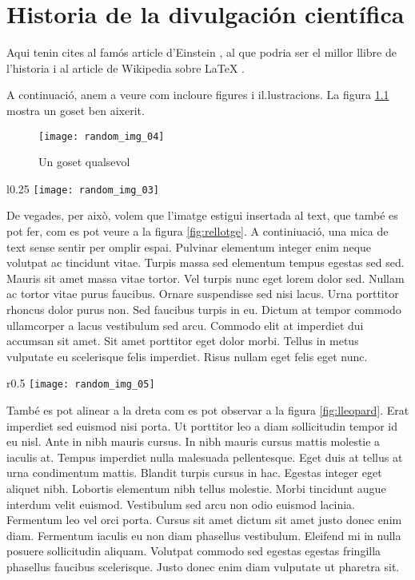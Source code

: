 \chapter{Historia de la divulgación científica}
\label{cap:primer}
Aqui tenin cites al famós article d'Einstein \autocite{Einstein05}, al que podria ser el millor llibre de l'historia \Autocite{GMMarquez67} i al article de Wikipedia sobre \LaTeX{} \autocite{Wikipedia_LaTeX}.

A continuació, anem a veure com incloure figures i il.lustracions. La figura \ref{fig:gos} mostra un goset ben aixerit.
\begin{figure}[h]
    \centering
    \texttt{[image: random\_img\_04]}
    \caption{Un goset qualsevol}
    \label{fig:gos}
\end{figure}

\begin{wrapfigure}{l}{0.25\textwidth}
    \centering
    \texttt{[image: random\_img\_03]}
    \caption{El temps vola}
    \label{fig:rellotge}
\end{wrapfigure}

De vegades, per això, volem que l'imatge estigui insertada al text, que també es pot fer, com es pot veure a la figura \ref{fig:rellotge}. A continiuació, una mica de text sense sentir per omplir espai. Pulvinar elementum integer enim neque volutpat ac tincidunt vitae. Turpis massa sed elementum tempus egestas sed sed. Mauris sit amet massa vitae tortor. Vel turpis nunc eget lorem dolor sed. Nullam ac tortor vitae purus faucibus. Ornare suspendisse sed nisi lacus. Urna porttitor rhoncus dolor purus non. Sed faucibus turpis in eu. Dictum at tempor commodo ullamcorper a lacus vestibulum sed arcu. Commodo elit at imperdiet dui accumsan sit amet. Sit amet porttitor eget dolor morbi. Tellus in metus vulputate eu scelerisque felis imperdiet. Risus nullam eget felis eget nunc.

\begin{wrapfigure}{r}{0.5\textwidth}
    \centering
    \texttt{[image: random\_img\_05]}
    \caption{El lleopard}
    \label{fig:lleopard}
\end{wrapfigure}
També es pot alinear a la dreta com es pot observar a la figura \ref{fig:lleopard}. Erat imperdiet sed euismod nisi porta. Ut porttitor leo a diam sollicitudin tempor id eu nisl. Ante in nibh mauris cursus. In nibh mauris cursus mattis molestie a iaculis at. Tempus imperdiet nulla malesuada pellentesque. Eget duis at tellus at urna condimentum mattis. Blandit turpis cursus in hac. Egestas integer eget aliquet nibh. Lobortis elementum nibh tellus molestie. Morbi tincidunt augue interdum velit euismod. Vestibulum sed arcu non odio euismod lacinia. Fermentum leo vel orci porta. Cursus sit amet dictum sit amet justo donec enim diam. Fermentum iaculis eu non diam phasellus vestibulum. Eleifend mi in nulla posuere sollicitudin aliquam. Volutpat commodo sed egestas egestas fringilla phasellus faucibus scelerisque. Justo donec enim diam vulputate ut pharetra sit.

